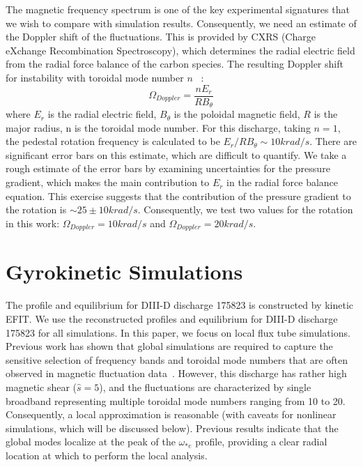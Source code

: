 \documentclass[
 aip,
 amsmath,amssymb,
 reprint
]{revtex4-1}
\begin{document}


The magnetic frequency spectrum is one of the key experimental signatures that we wish to compare with simulation results.  Consequently, we need an estimate of the Doppler shift of the fluctuations.  This is provided by CXRS (Charge eXchange Recombination Spectroscopy), which determines the radial electric field from the radial force balance of the carbon species.  The resulting Doppler shift for instability with toroidal mode number $n$ ~\cite{Hatch_2021}:
\begin{equation}
    \Omega_{Doppler} = \frac{n E_r}{R B_\theta} 
\end{equation}
where $E_r$ is the radial electric field, $B_\theta$ is the poloidal magnetic field, $R$ is the major radius, n is the toroidal mode number.  For this discharge, taking $n=1$, the pedestal rotation frequency is calculated to be $E_r / RB_\theta \sim 10 krad/s$.  There are significant error bars on this estimate, which are difficult to quantify.  We take a rough estimate of the error bars by examining uncertainties for the pressure gradient, which makes the main contribution to $E_r$ in the radial force balance equation.  This exercise suggests that the contribution of the pressure gradient to the rotation is $\sim 25 \pm 10 krad/s$.  Consequently, we test two values for the rotation in this work: $\Omega_{Doppler} = 10 krad / s$ and $\Omega_{Doppler} = 20 krad / s$.


\section{Gyrokinetic Simulations}
\label{simulations}

The profile and equilibrium for DIII-D discharge 175823 is constructed by kinetic EFIT\cite{kinetic_EFIT}. 
We use the reconstructed profiles and equilibrium for DIII-D discharge 175823 for all simulations.  In this paper, we focus on local flux tube simulations.  Previous work has shown that global simulations are required to capture the sensitive selection of frequency bands and toroidal mode numbers that are often observed in magnetic fluctuation data~\cite{Hatch_2021,Joel_prl}.  However, this discharge has rather high magnetic shear ($\hat{s}=5$), and the fluctuations are characterized by single broadband representing multiple toroidal mode numbers ranging from 10 to 20.  Consequently, a local approximation is reasonable (with caveats for nonlinear simulations, which will be discussed below).  Previous results indicate that the global modes localize at the peak of the $\omega_{*e}$ profile, providing a clear radial location at which to perform the local analysis.  
\end{document}
